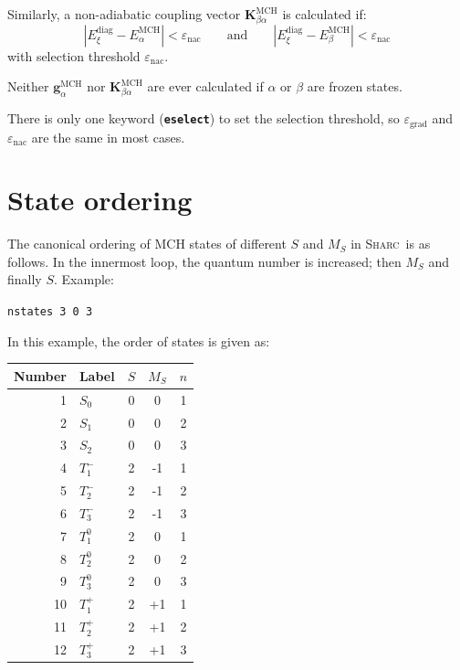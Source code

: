 \documentclass[a4paper,11pt,DIV=15,openany,twoside=false]{scrbook}
\newcommand{\sharc}{\textsc{Sharc}}
\newcommand{\ttt}[1]{\textbf{\texttt{#1}}}
\newcommand{\VEC}[1]{\ensuremath{\mathbf{#1}}}
\newenvironment{example}{
  \vspace{0mm}
  \definecolor{shadecolor}{HTML}{E4F4FF}
  \begin{shaded}
}{
  \end{shaded}
}
\begin{document}
Similarly, a non-adiabatic coupling vector $\VEC{K}^{\text{MCH}}_{\beta\alpha}$ is calculated if:
\begin{equation}
  \left|
    E^{\text{diag}}_\xi - E^{\text{MCH}}_\alpha
  \right|
  <
  \varepsilon_\text{nac}
  \qquad\text{and}\qquad
  \left|
    E^{\text{diag}}_\xi - E^{\text{MCH}}_\beta
  \right|
  <
  \varepsilon_\text{nac}
\end{equation}
with selection threshold $\varepsilon_\text{nac}$.

Neither $\VEC{g}^{\text{MCH}}_\alpha$ nor $\VEC{K}^{\text{MCH}}_{\beta\alpha}$ are ever calculated if $\alpha$ or $\beta$ are frozen states.

There is only one keyword (\ttt{eselect}) to set the selection threshold, so $\varepsilon_\text{grad}$ and $\varepsilon_\text{nac}$ are the same in most cases. 


\section{State ordering}\label{met:ordering}

The canonical ordering of MCH states of different $S$ and $M_S$ in \sharc\ is as follows. In the innermost loop, the quantum number is increased; then $M_S$ and finally $S$. Example:

\begin{example}
  \verb|nstates 3 0 3|
\end{example}

In this example, the order of states is given as:

\begin{tabular}{rlccc}
  \toprule
  Number      &Label       &$S$ &$M_S$  &$n$\\
  \midrule
  1&$S_0$       &0&0&1\\
  2&$S_1$       &0&0&2\\
  3&$S_2$       &0&0&3\\
  4&$T_1^-$       &2&-1&1\\
  5&$T_2^-$       &2&-1&2\\
  6&$T_3^-$       &2&-1&3\\
  7&$T_1^0$       &2&0&1\\
  8&$T_2^0$       &2&0&2\\
  9&$T_3^0$       &2&0&3\\
  10&$T_1^+$       &2&+1&1\\
  11&$T_2^+$       &2&+1&2\\
  12&$T_3^+$       &2&+1&3\\
  \bottomrule
\end{tabular}
\end{document}
